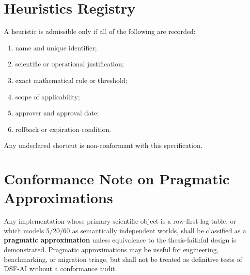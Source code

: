 \section{Heuristics Registry}

A heuristic is admissible only if all of the following are recorded:
\begin{enumerate}[leftmargin=1.2cm]
    \item name and unique identifier;
    \item scientific or operational justification;
    \item exact mathematical rule or threshold;
    \item scope of applicability;
    \item approver and approval date;
    \item rollback or expiration condition.
\end{enumerate}
Any undeclared shortcut is non-conformant with this specification.

\section{Conformance Note on Pragmatic Approximations}

Any implementation whose primary scientific object is a row-first lag table, or which models 5/20/60 as semantically independent worlds, shall be classified as a \textbf{pragmatic approximation} unless equivalence to the thesis-faithful design is demonstrated. Pragmatic approximations may be useful for engineering, benchmarking, or migration triage, but shall not be treated as definitive tests of DSF-AI without a conformance audit.
